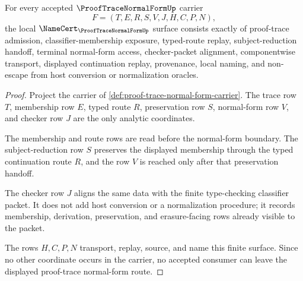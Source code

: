 \begin{theorem}
\label{thm:proof-trace-normal-form-namecert-obligations}
For every accepted $\ProofTraceNormalFormUp$ carrier
$$
F=(T,E,R,S,V,J,H,C,P,N),
$$
the local $\NameCert_{\ProofTraceNormalFormUp}$ surface consists exactly of proof-trace admission, classifier-membership exposure, typed-route replay, subject-reduction handoff, terminal normal-form access, checker-packet alignment, componentwise transport, displayed continuation replay, provenance, local naming, and non-escape from host conversion or normalization oracles.
\end{theorem}
\begin{proof}
Project the carrier of \autoref{def:proof-trace-normal-form-carrier}. The trace row $T$, membership row $E$, typed route $R$, preservation row $S$, normal-form row $V$, and checker row $J$ are the only analytic coordinates.

The membership and route rows are read before the normal-form boundary. The subject-reduction row $S$ preserves the displayed membership through the typed continuation route $R$, and the row $V$ is reached only after that preservation handoff.

The checker row $J$ aligns the same data with the finite type-checking classifier packet. It does not add host conversion or a normalization procedure; it records membership, derivation, preservation, and erasure-facing rows already visible to the packet.

The rows $H,C,P,N$ transport, replay, source, and name this finite surface. Since no other coordinate occurs in the carrier, no accepted consumer can leave the displayed proof-trace normal-form route.
\end{proof}


